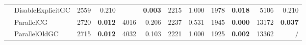 \begin{table*}
{\begin{tabular}{cl|rr|rr|rr|rr|rr}
			    & DisableExplicitGC   	& 2559                    & 0.210                      & \best3911                      & \bf 0.003              & 2215                      & 1.000                   & 1978                         & \bf 0.018                        & 5106                 & 0.210              \\
			    & ParallelCG          	& 2720                    & \bf 0.012                  & 4016                      & 0.206                  & 2237                      & 0.531                   & 1945                         & \bf 0.000                    & 13172                       & \bf 0.037    	          \\
			    & ParallelOldGC       	& 2715                    & \bf 0.012                  & 4032                      & 0.103                  & 2221                      & 1.000                   & 1925                         & \bf 0.002                    & 13362                       & /            	          \\


\end{tabular}}
\end{table*}

